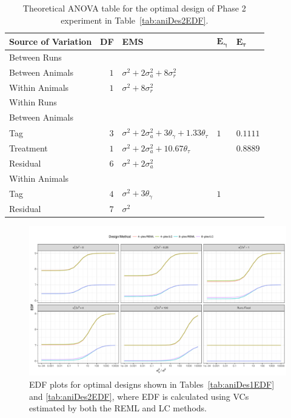 \begin{table}[!ht]
\centering
 \caption{Theoretical ANOVA table for the optimal design of Phase 2 experiment in Table~\ref{tab:aniDes2EDF}.}
 \begin{tabular}[t]{lrlll} 
 \toprule 
 \multicolumn{1}{l}{\textbf{Source of Variation}} & \multicolumn{1}{l}{\textbf{DF}} & \multicolumn{1}{l}{\textbf{EMS}}& \multicolumn{1}{l}{$\bm{E_{\gamma}}$}&\multicolumn{1}{l}{$\bm{E_{\tau}}$}\\ 
 \midrule 
 Between Runs &  &  & & \\ 
 \quad Between Animals & $1$ & $\sigma^2+2\sigma_{a}^2+8\sigma_{r}^2$ & & \\  \quad Within Animals & $1$ & $\sigma^2+8\sigma_{r}^2$ & & \\ \hline 
 Within Runs &  &  & & \\ 
 \quad Between Animals &  &  & & \\ 
 \quad \quad Tag & $3$ & $\sigma^2+2\sigma_{a}^2+3\theta_{\gamma}+ 1.33\theta_{\tau}$ &$1$ & $0.1111$\\ 
 \quad \quad Treatment & $1$ & $\sigma^2+2\sigma_{a}^2+10.67\theta_{\tau}$ & & $0.8889$\\ 
 \quad \quad Residual & $6$ & $\sigma^2+2\sigma_{a}^2$ & & \\ \hline 
 \quad Within Animals &  &  & & \\ 
 \quad \quad Tag & $4$ & $\sigma^2+3\theta_{\gamma}$ &$1$ & \\ 
 \quad \quad Residual & $7$ & $\sigma^2$ & & \\ 
 \bottomrule 
 \end{tabular} 
 \label{tab:ANOVAPhase1CRD12} 
\end{table} 

\begin{figure}[!ht]
\centering
\includegraphics[width=1 \textwidth]{Chapter5/Graph/CRD262.pdf}
\caption{EDF plots for optimal designs shown in Tables~\ref{tab:aniDes1EDF} and \ref{tab:aniDes2EDF}, where EDF is calculated using VCs estimated by both the REML and LC methods.}
\label{fig:compare48CRD1}
\end{figure}

